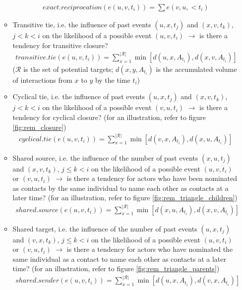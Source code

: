 \begin{itemize}
\begin{itemize}
		\begin{align*}
			exact.reciprocation(e(u,v,t_i)) = \sum e(v,u,<t_i)
		\end{align*}
		\item Transitive tie, i.e. the influence of past events $(u,x,t_j)$ and $(x,v,t_k)$, $j < k < i$ on the likelihood of a possible event $(u,v,t_i)$ $\rightarrow$ is there a tendency for transitive closure?
		\begin{align*}
			transitive.tie(e(u,v,t_i)) = \sum_{x=1}^{\lvert \mathcal{R} \rvert} \min [d(u,x,A_{t_i}), d(x,v,A_{t_i})]
		\end{align*}
		($\mathcal{R}$ is the set of potential targets; $d(x,y,A_{t_i})$ is the accumulated volume of interactions from $x$ to $y$ by the time $t_i$)
		\item Cyclical tie, i.e. the influence of past events $(u,x,t_j)$ and $(x,v,t_k)$, $j < k < i$ on the likelihood of a possible event $(v,u,t_i)$ $\rightarrow$ is there a tendency for cyclical closure? (for an illustration, refer to figure \ref{fig:rem_closure})
		\begin{align*}
			cyclical.tie(e(u,v,t_i)) = \sum_{x=1}^{\lvert \mathcal{R} \rvert} \min [d(v,x,A_{t_i}), d(x,u,A_{t_i})]
		\end{align*}
		\item Shared source, i.e. the influence of the number of past events $(x,u,t_j)$ and $(x,v,t_k)$, $j \leq k < i$ on the likelihood of a possible event $(u,v,t_i)$ or $(v,u,t_i)$ $\rightarrow$ is there a tendency for actors who have been nominated as contacts by the same individual to name each other as contacts at a later time? (for an illustration, refer to figure \ref{fig:rem_triangle_children})
		\begin{align*}
			shared.source(e(u,v,t_i)) = \sum_{x=1}^{\lvert \mathcal{R} \rvert} \min [d(x,u,A_{t_i}), d(x,v,A_{t_i})]
		\end{align*}
		\item Shared target, i.e. the influence of the number of past events $(u,x,t_j)$ and $(v,x,t_k)$, $j \leq k < i$ on the likelihood of a possible event $(u,v,t_i)$ or $(v,u,t_i)$ $\rightarrow$ is there a tendency for actors who have nominated the same individual as a contact to name each other as contacts at a later time? (for an illustration, refer to figure \ref{fig:rem_triangle_parents})
		\begin{align*}
			shared.sender(e(u,v,t_i)) = \sum_{x=1}^{\lvert \mathcal{R} \rvert} \min [d(u,x,A_{t_i}), d(v,x,A_{t_i})]
		\end{align*}

\end{itemize}
\end{itemize}
